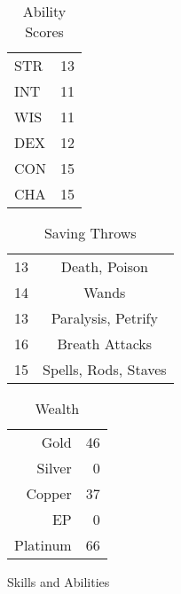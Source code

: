 \documentclass[a4paper]{article}
\begin{document}
\begin{multicols}{2}
\begin{table}[H]
  \begin{center}
    \caption*{Ability Scores}
    \begin{tabular}{l|r} %
      STR & 13\\
      INT & 11\\
      WIS & 11\\
      DEX & 12\\
      CON & 15\\
      CHA & 15\\
    \end{tabular}
  \end{center}
\end{table}
\begin{table}[H]
  \begin{center}
    \caption*{Saving Throws}
    \begin{tabular}{l|c} %
      13 & Death, Poison\\
      14 & Wands\\
      13 & Paralysis, Petrify\\
      16 & Breath Attacks\\
      15 & Spells, Rods, Staves\\
    \end{tabular}
  \end{center}
\end{table}
\begin{table}[H]
  \begin{center}
    \caption*{Wealth}
    \begin{tabular}{r|r} %
      Gold     & 46\\
      Silver   & 0\\
      Copper   & 37\\
      EP       & 0\\
      Platinum & 66\\
    \end{tabular}
  \end{center}
\end{table}
\begin{table}[H]
  \begin{center}
    \caption*{Skills and Abilities}

\end{center}
\end{table}
\end{multicols}
\end{document}
